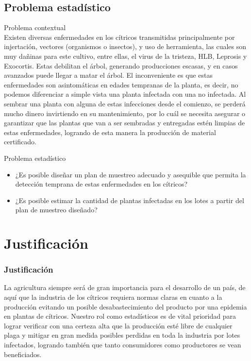 \documentclass[10pt]{beamer}
\begin{document}
\subsection{Problema estadístico}
\begin{frame}
\begin{block}{Problema contextual}
\justifying
~\\Existen diversas enfermedades en los cítricos transmitidas principalmente por injertación, vectores (organismos o insectos), y uso de herramienta, las cuales son muy dañinas para este cultivo, entre ellas, el virus de la tristeza, HLB, Leprosis y Exocortis. Estas debilitan el árbol, generando producciones escasas, y en casos avanzados puede llegar a matar el árbol. El inconveniente es que estas enfermedades son asintomáticas en edades tempranas de la planta, es decir, no podemos diferenciar a simple vista una planta infectada con una no infectada. Al sembrar una planta con alguna de estas infecciones desde el comienzo, se perderá mucho dinero invirtiendo en su mantenimiento, por lo cuál se necesita asegurar o garantizar que las plantas que van a ser sembradas y entregadas estén limpias de estas enfermedades, logrando de esta manera la producción de material certificado.
\end{block}
\begin{block}{Problema estadístico}
\begin{itemize}
\justifying
\item ¿Es posible diseñar un plan de muestreo adecuado y asequible que permita la detección temprana de estas enfermedades en los cítricos?
\item ¿Es posible estimar la cantidad de plantas infectadas en los lotes a partir del plan de muestreo diseñado?
\end{itemize}
\end{block}
\end{frame}


\section{Justificación}
\begin{frame}
\frametitle{Justificación}
\justifying
La agricultura siempre será de gran importancia para el desarrollo de un país, de aquí que la industria de los cítricos requiera normas claras en cuanto a la producción evitando un posible desabastecimiento del producto por una epidemia en plantas de cítricos. Nuestro rol como estadísticos es de vital prioridad para lograr verificar con una certeza alta que la producción esté libre de cualquier plaga y mitigar en gran medida posibles perdidas en toda la industria por lotes infectados, logrando también que tanto consumidores como productores se vean beneficiados.
\end{frame}
\end{document}
